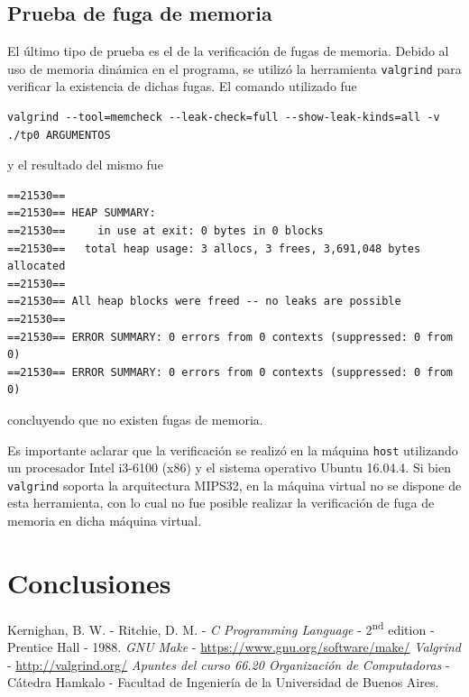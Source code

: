 
\clearpage

\subsection{Prueba de fuga de memoria}
El último tipo de prueba es el de la verificación de fugas de memoria. Debido al uso de memoria dinámica en el programa, se utilizó la herramienta \texttt{valgrind} \cite{valgrind} para verificar la existencia de dichas fugas. El comando utilizado fue
\begin{lstlisting}
valgrind --tool=memcheck --leak-check=full --show-leak-kinds=all -v ./tp0 ARGUMENTOS
\end{lstlisting}
y el resultado del mismo fue
\begin{lstlisting}
==21530==
==21530== HEAP SUMMARY:
==21530==     in use at exit: 0 bytes in 0 blocks
==21530==   total heap usage: 3 allocs, 3 frees, 3,691,048 bytes allocated
==21530==
==21530== All heap blocks were freed -- no leaks are possible
==21530==
==21530== ERROR SUMMARY: 0 errors from 0 contexts (suppressed: 0 from 0)
==21530== ERROR SUMMARY: 0 errors from 0 contexts (suppressed: 0 from 0)
\end{lstlisting}
concluyendo que no existen fugas de memoria.

Es importante aclarar que la verificación se realizó en la máquina \texttt{host} utilizando un procesador Intel i3-6100 (x86) y el sistema operativo Ubuntu 16.04.4. Si bien \texttt{valgrind} soporta la arquitectura MIPS32, en la máquina virtual no se dispone de esta herramienta, con lo cual no fue posible realizar la verificación de fuga de memoria en dicha máquina virtual.

\section{Conclusiones}

\clearpage
\begin{thebibliography}{10}
	 Kernighan, B. W. - Ritchie, D. M. - \emph{C Programming Language} - 2\textsuperscript{nd} edition - Prentice Hall - 1988.
	 \emph{GNU Make} - \hyperlink{make}{https://www.gnu.org/software/make/}
	 \emph{Valgrind} - \hyperlink{valgrind}{http://valgrind.org/}
	 \emph{Apuntes del curso 66.20 Organización de Computadoras} - Cátedra Hamkalo - Facultad de Ingeniería de la Universidad de Buenos Aires.
\end{thebibliography}
\clearpage

